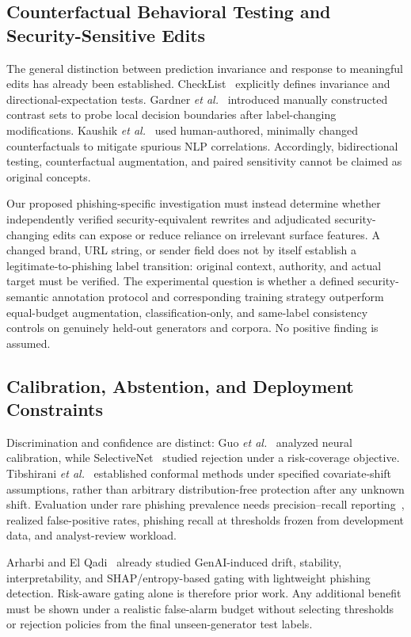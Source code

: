 \subsection{Counterfactual Behavioral Testing and Security-Sensitive Edits}
The general distinction between prediction invariance and response to meaningful edits has already been established. CheckList~\cite{ribeiro2020checklist} explicitly defines invariance and directional-expectation tests. Gardner \emph{et al.}~\cite{gardner2020contrast} introduced manually constructed contrast sets to probe local decision boundaries after label-changing modifications. Kaushik \emph{et al.}~\cite{kaushik2020cad} used human-authored, minimally changed counterfactuals to mitigate spurious NLP correlations. Accordingly, bidirectional testing, counterfactual augmentation, and paired sensitivity cannot be claimed as original concepts.

Our proposed phishing-specific investigation must instead determine whether independently verified security-equivalent rewrites and adjudicated security-changing edits can expose or reduce reliance on irrelevant surface features. A changed brand, URL string, or sender field does not by itself establish a legitimate-to-phishing label transition: original context, authority, and actual target must be verified. The experimental question is whether a defined security-semantic annotation protocol and corresponding training strategy outperform equal-budget augmentation, classification-only, and same-label consistency controls on genuinely held-out generators and corpora. No positive finding is assumed.

\subsection{Calibration, Abstention, and Deployment Constraints}
Discrimination and confidence are distinct: Guo \emph{et al.}~\cite{guo2017calibration} analyzed neural calibration, while SelectiveNet~\cite{geifman2019selectivenet} studied rejection under a risk-coverage objective. Tibshirani \emph{et al.}~\cite{tibshirani2019conformal} established conformal methods under specified covariate-shift assumptions, rather than arbitrary distribution-free protection after any unknown shift. Evaluation under rare phishing prevalence needs precision--recall reporting~\cite{saito2015precision}, realized false-positive rates, phishing recall at thresholds frozen from development data, and analyst-review workload.

Arharbi and El Qadi~\cite{arharbi2026shifts} already studied GenAI-induced drift, stability, interpretability, and SHAP/entropy-based gating with lightweight phishing detection. Risk-aware gating alone is therefore prior work. Any additional benefit must be shown under a realistic false-alarm budget without selecting thresholds or rejection policies from the final unseen-generator test labels.

